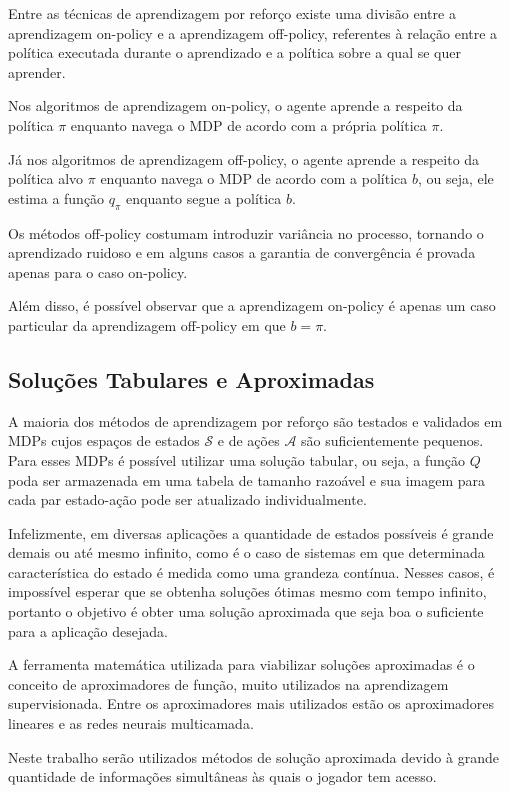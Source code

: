 Entre as técnicas de aprendizagem por reforço existe uma divisão entre a aprendizagem on-policy e a aprendizagem off-policy, referentes à relação entre a política executada durante o aprendizado e a política sobre a qual se quer aprender.

Nos algoritmos de aprendizagem on-policy, o agente aprende a respeito da política $\pi$ enquanto navega o MDP de acordo com a própria política $\pi$.

Já nos algoritmos de aprendizagem off-policy, o agente aprende a respeito da política alvo $\pi$ enquanto navega o MDP de acordo com a política $b$, ou seja, ele estima a função $q_{\pi}$ enquanto segue a política $b$.

Os métodos off-policy costumam introduzir variância no processo, tornando o aprendizado ruidoso e em alguns casos a garantia de convergência é provada apenas para o caso on-policy. %

Além disso, é possível observar que a aprendizagem on-policy é apenas um caso particular da aprendizagem off-policy em que $b = \pi$.

\subsection{Soluções Tabulares e Aproximadas}

A maioria dos métodos de aprendizagem por reforço são testados e validados em MDPs cujos espaços de estados $\mathcal{S}$ e de ações $\mathcal{A}$ são suficientemente pequenos. Para esses MDPs é possível utilizar uma solução tabular, ou seja, a função $Q$ poda ser armazenada em uma tabela de tamanho razoável e sua imagem para cada par estado-ação pode ser atualizado individualmente.

Infelizmente, em diversas aplicações a quantidade de estados possíveis é grande demais ou até mesmo infinito, como é o caso de sistemas em que determinada característica do estado é medida como uma grandeza contínua. Nesses casos, é impossível esperar que se obtenha soluções ótimas mesmo com tempo infinito, portanto o objetivo é obter uma solução aproximada que seja boa o suficiente para a aplicação desejada.

A ferramenta matemática utilizada para viabilizar soluções aproximadas é o conceito de aproximadores de função, muito utilizados na aprendizagem supervisionada. Entre os aproximadores mais utilizados estão os aproximadores lineares e as redes neurais multicamada.

Neste trabalho serão utilizados métodos de solução aproximada devido à grande quantidade de informações simultâneas às quais o jogador tem acesso.

